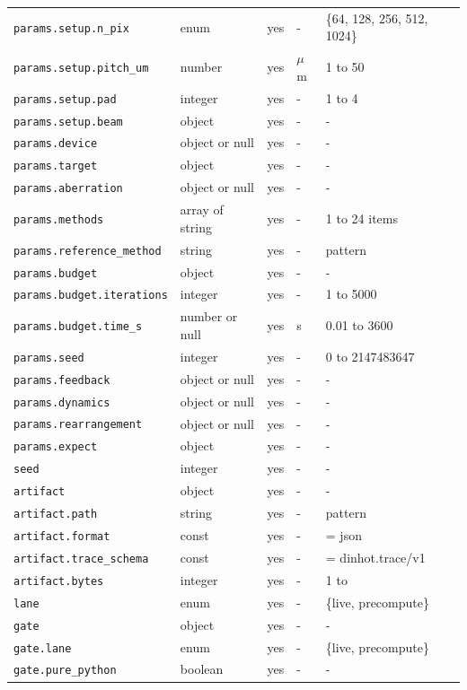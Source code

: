 \begin{longtable}{@{}l l c l l@{}}
\texttt{params.setup.n\_pix} & enum & yes & - & \{64, 128, 256, 512, 1024\}\\
\texttt{params.setup.pitch\_um} & number & yes & $\mu$m & 1 to 50\\
\texttt{params.setup.pad} & integer & yes & - & 1 to 4\\
\texttt{params.setup.beam} & object & yes & - & -\\
\texttt{params.device} & object or null & yes & - & -\\
\texttt{params.target} & object & yes & - & -\\
\texttt{params.aberration} & object or null & yes & - & -\\
\texttt{params.methods} & array of string & yes & - & 1 to 24 items\\
\texttt{params.reference\_method} & string & yes & - & pattern\\
\texttt{params.budget} & object & yes & - & -\\
\texttt{params.budget.iterations} & integer & yes & - & 1 to 5000\\
\texttt{params.budget.time\_s} & number or null & yes & s & 0.01 to 3600\\
\texttt{params.seed} & integer & yes & - & 0 to 2147483647\\
\texttt{params.feedback} & object or null & yes & - & -\\
\texttt{params.dynamics} & object or null & yes & - & -\\
\texttt{params.rearrangement} & object or null & yes & - & -\\
\texttt{params.expect} & object & yes & - & -\\
\texttt{seed} & integer & yes & - & -\\
\texttt{artifact} & object & yes & - & -\\
\texttt{artifact.path} & string & yes & - & pattern\\
\texttt{artifact.format} & const & yes & - & = json\\
\texttt{artifact.trace\_schema} & const & yes & - & = dinhot.trace/v1\\
\texttt{artifact.bytes} & integer & yes & - & 1 to\\
\texttt{lane} & enum & yes & - & \{live, precompute\}\\
\texttt{gate} & object & yes & - & -\\
\texttt{gate.lane} & enum & yes & - & \{live, precompute\}\\
\texttt{gate.pure\_python} & boolean & yes & - & -\\

\end{longtable}

